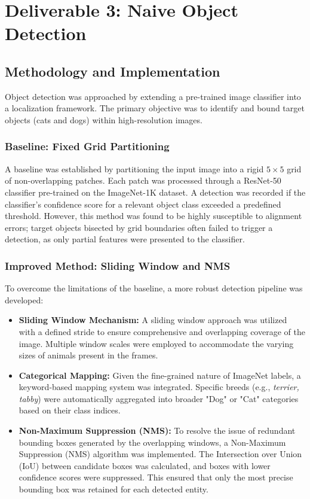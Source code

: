 \documentclass[11pt]{article}
\begin{document}
\clearpage
\section{Deliverable 3: Naive Object Detection}

\subsection{Methodology and Implementation}
Object detection was approached by extending a pre-trained image classifier into a localization framework. The primary objective was to identify and bound target objects (cats and dogs) within high-resolution images.

\subsubsection{Baseline: Fixed Grid Partitioning}
A baseline was established by partitioning the input image into a rigid $5 \times 5$ grid of non-overlapping patches. Each patch was processed through a ResNet-50 classifier pre-trained on the ImageNet-1K dataset. A detection was recorded if the classifier's confidence score for a relevant object class exceeded a predefined threshold. However, this method was found to be highly susceptible to alignment errors; target objects bisected by grid boundaries often failed to trigger a detection, as only partial features were presented to the classifier.

\subsubsection{Improved Method: Sliding Window and NMS}
To overcome the limitations of the baseline, a more robust detection pipeline was developed:
\begin{itemize}
    \item \textbf{Sliding Window Mechanism:} A sliding window approach was utilized with a defined stride to ensure comprehensive and overlapping coverage of the image. Multiple window scales were employed to accommodate the varying sizes of animals present in the frames.
    \item \textbf{Categorical Mapping:} Given the fine-grained nature of ImageNet labels, a keyword-based mapping system was integrated. Specific breeds (e.g., \textit{terrier, tabby}) were automatically aggregated into broader "Dog" or "Cat" categories based on their class indices.
    \item \textbf{Non-Maximum Suppression (NMS):} To resolve the issue of redundant bounding boxes generated by the overlapping windows, a Non-Maximum Suppression (NMS) algorithm was implemented. The Intersection over Union (IoU) between candidate boxes was calculated, and boxes with lower confidence scores were suppressed. This ensured that only the most precise bounding box was retained for each detected entity.
\end{itemize}
\end{document}
